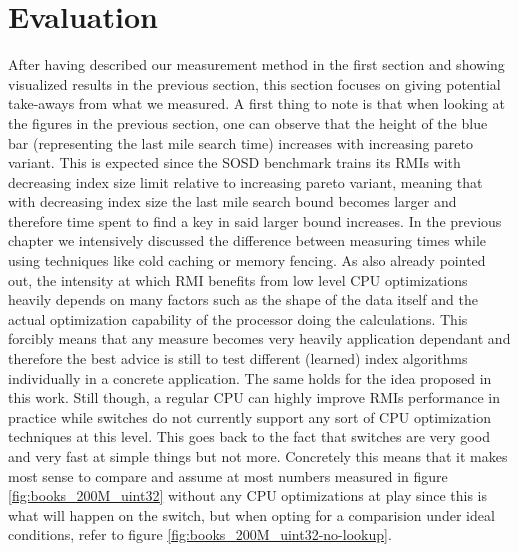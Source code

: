 \section{Evaluation}
After having described our measurement method in the first section and showing visualized results in the previous section, this section focuses on giving potential take-aways from what we measured. A first thing to note is that when looking at the figures in the previous section, one can observe that the height of the blue bar (representing the last mile search time) increases with increasing pareto variant. This is expected since the SOSD benchmark trains its RMIs with decreasing index size limit relative to increasing pareto variant, meaning that with decreasing index size the last mile search bound becomes larger and therefore time spent to find a key in said larger bound increases. In the previous chapter we intensively discussed the difference between measuring times while using techniques like cold caching or memory fencing. As \cite{sosd-neurips} also already pointed out, the intensity at which RMI benefits from low level CPU optimizations heavily depends on many factors such as the shape of the data itself and the actual optimization capability of the processor doing the calculations. This forcibly means that any measure becomes very heavily application dependant and therefore the best advice is still to test different (learned) index algorithms individually in a concrete application. The same holds for the idea proposed in this work. Still though, a regular CPU can highly improve RMIs performance in practice while switches do not currently support any sort of CPU optimization techniques at this level. This goes back to the fact that switches are very good and very fast at simple things but not more. Concretely this means that it makes most sense to compare and assume at most numbers measured in figure \ref{fig:books_200M_uint32} without any CPU optimizations at play since this is what will happen on the switch, but when opting for a comparision under ideal conditions, refer to figure \ref{fig:books_200M_uint32-no-lookup}.\\

